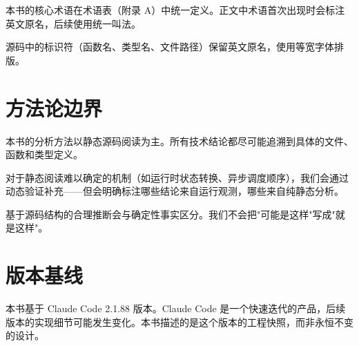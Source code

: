 本书的核心术语在术语表（附录 A）中统一定义。正文中术语首次出现时会标注英文原名，后续使用统一叫法。

源码中的标识符（函数名、类型名、文件路径）保留英文原名，使用等宽字体排版。

\section*{方法论边界}

本书的分析方法以静态源码阅读为主。所有技术结论都尽可能追溯到具体的文件、函数和类型定义。

对于静态阅读难以确定的机制（如运行时状态转换、异步调度顺序），我们会通过动态验证补充——但会明确标注哪些结论来自运行观测，哪些来自纯静态分析。

基于源码结构的合理推断会与确定性事实区分。我们不会把"可能是这样"写成"就是这样"。

\section*{版本基线}

本书基于 Claude Code 2.1.88 版本。Claude Code 是一个快速迭代的产品，后续版本的实现细节可能发生变化。本书描述的是这个版本的工程快照，而非永恒不变的设计。
